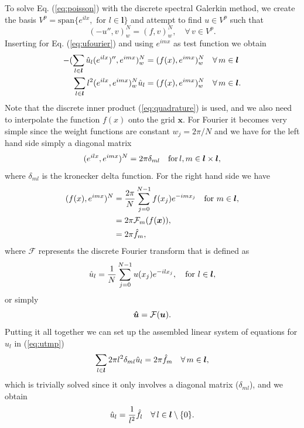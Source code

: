 \documentclass[%
oneside,                 %
final,                   %
10pt]{article}
\begin{document}
To solve Eq. (\ref{eq:poisson}) with the discrete spectral Galerkin method, we create the basis $V^p = \text{span}\{ e^{ilx} , \text{ for } l \in \boldsymbol{l}\} $ and attempt to find $u \in V^p$ such that
\begin{equation}
(-u'', v)_w^N = (f, v)_w^N, \quad \forall \, v \in V^p.
\end{equation}
Inserting for Eq. (\ref{eq:ufourier}) and using $e^{imx}$ as test function we obtain
\begin{align}
-(\sum_{l \in \boldsymbol{l}} \hat{u}_l (e^{ilx})'', e^{imx})_w^N &= (f(x), e^{imx})_w^N \quad \forall \, m \in \boldsymbol{l} \\
\sum_{l \in \boldsymbol{l}} l^2( e^{ilx}, e^{imx})_w^N \hat{u}_l &= (f(x), e^{imx})_w ^N\quad \forall \, m \in \boldsymbol{l}. \label{eq:utmp}
\end{align}
Note that the discrete inner product (\ref{eq:quadrature}) is used, and we also need to interpolate the function $f(x)$ onto the grid $\boldsymbol{x}$. For Fourier it becomes very simple since the weight functions are constant $w_j = 2\pi/N$ and we have for the left hand side simply a diagonal matrix
\begin{equation}
( e^{ilx}, e^{imx})^N = 2\pi \delta_{ml} \quad \text{for} \, l, m \in \boldsymbol{l} \times \boldsymbol{l},
\end{equation}
where $\delta_{ml}$ is the kronecker delta function.
For the right hand side we have
\begin{align}
(f(x), e^{imx})^N &= \frac{2 \pi}{N}\sum_{j=0}^{N-1} f(x_j) e^{-imx_j} \quad \text{for } m \in \boldsymbol{l}, \\
 &= 2 \pi \mathcal{F}_m(f(\boldsymbol{x})), \\
 &= 2 \pi \hat{f}_m,
\end{align}
where $\mathcal{F}$ represents the discrete Fourier transform that is defined as
\begin{equation}
\hat{u}_l = \frac{1}{N}\sum_{j=0}^{N-1} u(x_j) e^{-ilx_j}, \quad \text{for } l \in \boldsymbol{l},
\end{equation}
or simply
\begin{equation}
  \boldsymbol{\hat{u}} = \mathcal{F}(\boldsymbol{u}).
\end{equation}
Putting it all together we can set up the assembled linear system of equations for $\hat{u}_l$ in (\ref{eq:utmp})
\begin{equation}
\sum_{l \in \boldsymbol{l}}2 \pi l^2 \delta_{ml} \hat{u}_l = 2 \pi \hat{f}_{m} \quad \forall \, m \in \boldsymbol{l},
\end{equation}
which is trivially solved since it only involves a diagonal matrix ($\delta_{ml}$), and we obtain
\begin{equation}
\hat{u}_l = \frac{1}{l^2} \hat{f}_{l} \quad \forall \,l  \in \boldsymbol{l} \setminus{\{0\}}.
\end{equation}
\end{document}
